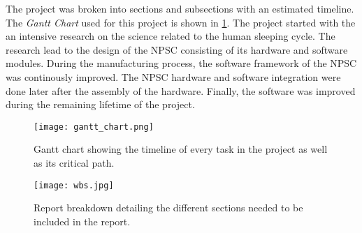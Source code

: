 The project was broken into sections and subsections with an estimated timeline.\\
The \textit{Gantt Chart} used for this project is shown in \cref{fig:gant}. The project started with the an intensive research on the science related to the human sleeping cycle. The research lead to the design of the NPSC consisting of its hardware and software modules. During the manufacturing process, the software framework of the NPSC was continously improved. The NPSC hardware and software integration were done later after the assembly of the hardware. Finally, the software was improved during the remaining lifetime of the project.
\begin{figure}[ht]
\centering
\texttt{[image: gantt\_chart.png]}
\caption{Gantt chart showing the timeline of every task in the project as well as its critical path.}
\label{fig:gant}
\end{figure}

\begin{landscape}
\begin{figure}[ht]
\centering
\texttt{[image: wbs.jpg]}
\caption{Report breakdown detailing the different sections needed to be included in the report.}
\label{fig:wbs}
\end{figure}
\end{landscape}


